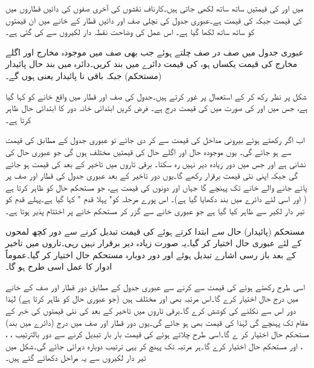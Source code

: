   میں      اور  کی قیمتیں  ساتھ ساتھ     لکھی جاتی ہیں۔کارناف نقشوں   کی آخری صفوں کی دائیں قطاروں  میں   کی قیمت   جبکہ   کی  قیمت   ہے۔عبوری جدول  کی نچلی صف  اور دائیں قطار  کے خانے میں ان قیمتوں کو ساتھ ساتھ   لکھا گیا ہے۔ اس عمل کی وضاحت نقطہ دار لکیروں سے  کی گئی ہے۔

عبوری جدول میں صف در صف چلتے ہوئے    جب  بھی     صف میں موجودہ مخارج  اور  اگلے مخارج  کی قیمت   یکساں ہو،  کی قیمت دائرے میں بند کریں۔دائرہ میں بند  حال    پائیدار   (مستحکم) جبکہ باقی نا پائیدار  یعنی    ہوں گے۔

شکل پر نظر رکھ  کر   کے استعمال پر غور کرتے ہیں۔جدول کی    صف  اور  قطار میں واقع خانے کو  کہا گیا ہے، جس میں  اور  کی صورت میں      کی قیمت  درج ہے۔ فرض  کریں ابتدائی خانہ دور کا ابتدائی حال ظاہر کرتا ہے۔

اب اگر   رکھتے ہوئے بیرونی مداخل  کی قیمت   سے    کر دی جائے تو عبوری جدول کے مطابق  کی قیمت  سے    ہو جائے گی۔ یوں   موجودہ حال  اور  اگلے حال   کی قیمتیں مختلف ہوں گی جو   عبوری  حال  کی نشانی ہے   اور جس میں دور   زیادہ دیر نہیں رہ سکتا۔ برقی تاروں میں تاخیر کے بعد   کی قیمت   ہو جائے گی جبکہ   اپنی نئی قیمت   برقرار رکھے گا۔یوں دور تاخیر کے بعد عبوری جدول کی   قطار اور   صف  پر پائے جانے والے خانے تک پہنچے گا جہاں  اور  دونوں کی قیمت  ہے، جو   مستحکم حال کو ظاہر کرتا ہے ( اور اسی لئے دائرے میں بند دکھایا گیا ہے)۔ اس پورے مرحلہ کو" پہلا قدم "  کہا گیا ہے۔پہلے قدم کو تیر  دار لکیر  سے ظاہر کیا گیا ہے جو عبوری خانے سے گزر کر مستحکم خانے پر  اختتام پذیر ہوتا ہے۔

   مستحکم (پائیدار) حال سے ابتدا کرتے ہوئے  کی قیمت تبدیل کرنے سے دور  کچھ لمحوں کے لئے  عبوری حال اختیار کر گیا۔یہ صورت زیادہ دیر برقرار نہیں رہی۔تاروں میں  تاخیر کے بعد  باز رسی اشارے تبدیل ہوئے اور دور دوبارہ  مستحکم حال اختیار کر گیا۔عموماً ادوار کا عمل اسی طرح ہو گا۔

اسی طرح   رکھتے ہوئے    کی قیمت  سے  کرنے سے  عبوری جدول کے مطابق دور   قطار اور   صف  کے خانے میں درج حال   اختیار کرے گا۔اس مرتبہ  بھی  اور  مختلف ہیں (جو عبوری حال کو ظاہر کرتا ہے)   لہٰذا دور اس سے نکلنے کی کوشش کرے گا۔برقی تاروں میں تاخیر کے بعد   کی  نئی قیمتوں  کی خبر   کے مقام تک پہنچے گی   لہٰذا  کی قیمت بھی   ہو جائے گی۔یوں دور  قطار اور   صف میں درج (دائرے میں بند)    مستحکم  حال  اختیار کر ے  گا۔اسی  طرح  چلاتے ہوئے  کی قیمت  بار بار تبدیل کرنے سے دور  بالترتیب  ، ،   ، اور  مستحکم حال اختیار کرے گا۔ہر مرتبہ  تک  پہنچ کر   یہی ترتیب  دوبارہ    دہرائی جائے گی۔شکل میں تیر  دار  لکیروں سے یہ مراحل دکھائے گئے ہیں۔

